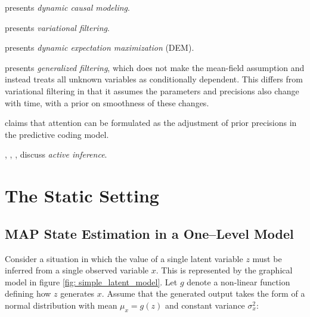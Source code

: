 \noindent \cite{friston2003dynamic} presents \textit{dynamic causal modeling}.
\newline

\noindent \cite{friston2008variational} presents \textit{variational filtering}.
\newline

\noindent \cite{friston2008DEM} presents \textit{dynamic expectation maximization} (DEM).
\newline

\noindent \cite{friston2010generalised} presents \textit{generalized filtering}, which does not make the mean-field assumption and instead treats all unknown variables as conditionally dependent. This differs from variational filtering \cite{friston2008variational} in that it assumes the parameters and precisions also change with time, with a prior on smoothness of these changes.
\newline

\noindent \cite{feldman2010attention} claims that attention can be formulated as the adjustment of prior precisions in the predictive coding model.
\newline

\noindent \cite{friston2011action}, \cite{friston2013anatomy} , \cite{friston2015active} \cite{friston2016active_process}, \cite{friston2016active} discuss \textit{active inference}.
\newline

\section{The Static Setting}

\subsection{MAP State Estimation in a One--Level Model}

Consider a situation in which the value of a single latent variable $z$ must be inferred from a single observed variable $x$. This is represented by the graphical model in figure  \ref{fig: simple_latent_model}. Let $g$ denote a non-linear function defining how $z$ generates $x$. Assume that the generated output takes the form of a normal distribution with mean $\mu_x = g(z)$ and constant variance $\sigma^2_x$:

